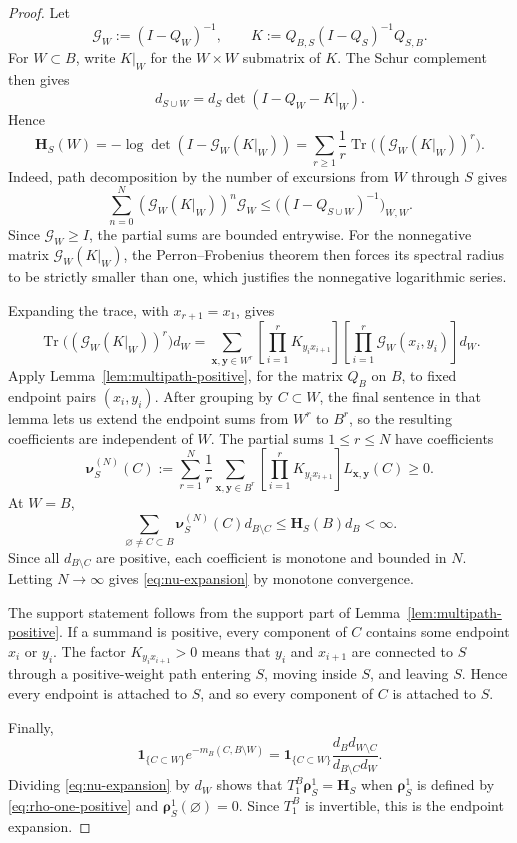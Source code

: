 \documentclass[11pt]{article}
\numberwithin{equation}{section}
\newcommand{\1}{\mathbf{1}}
\newcommand{\one}{\mathbf 1}
\newcommand{\Gc}{\mathcal G}
\newcommand{\bH}{\mathbf H}
\newcommand{\brho}{\boldsymbol{\rho}}
\newcommand{\bnu}{\boldsymbol{\nu}}
\begin{document}
\begin{proof}
Let
\[
        \Gc_W:=(I-Q_W)^{-1},
        \qquad
        K:=Q_{B,S}(I-Q_S)^{-1}Q_{S,B} .
\]
For \(W\subset B\), write \(K|_W\) for the \(W\times W\) submatrix of
\(K\).
The Schur complement then gives
\[
        d_{S\cup W}=d_S\det(I-Q_W-K|_W).
\]
Hence
\begin{equation}\label{eq:H-schur}
        \bH_S(W)=
        -\log\det(I-\Gc_W(K|_W))
        =\sum_{r\ge1}\frac1r\operatorname{Tr}\big((\Gc_W(K|_W))^r\big).
\end{equation}
Indeed, path decomposition by the number of excursions from \(W\) through
\(S\) gives
\[
 \sum_{n=0}^N(\Gc_W(K|_W))^n\Gc_W
 \leq\bigl((I-Q_{S\cup W})^{-1}\bigr)_{W,W}.
\]
Since \(\Gc_W\ge I\), the partial sums are bounded entrywise. For the
nonnegative matrix \(\Gc_W(K|_W)\), the Perron--Frobenius theorem then forces
its spectral radius to be strictly smaller than one, which justifies the
nonnegative logarithmic series.

Expanding the trace, with \(x_{r+1}=x_1\), gives
\[
        \operatorname{Tr}\big((\Gc_W(K|_W))^r\big)d_W
        =\sum_{\mathbf x,\mathbf y\in W^r}
        \left[\prod_{i=1}^rK_{y_i x_{i+1}}\right]
        \left[\prod_{i=1}^r\Gc_W(x_i,y_i)\right]d_W .
\]
Apply Lemma~\ref{lem:multipath-positive}, for the matrix \(Q_B\) on \(B\), to
fixed endpoint pairs \((x_i,y_i)\).  After grouping by \(C\subset W\), the
final sentence in that lemma lets us extend the endpoint sums
from \(W^r\) to \(B^r\), so the resulting coefficients are independent of \(W\).  The partial sums \(1\le r\le N\) have coefficients
\[
        \bnu_S^{(N)}(C):=
        \sum_{r=1}^N\frac1r\sum_{\mathbf x,\mathbf y\in B^r}
        \left[\prod_{i=1}^rK_{y_i x_{i+1}}\right]
        L_{\mathbf x,\mathbf y}(C)\ge0 .
\]
At \(W=B\),
\[
        \sum_{\varnothing\ne C\subset B}\bnu_S^{(N)}(C)d_{B\setminus C}
        \le \bH_S(B)d_B<\infty .
\]
Since all \(d_{B\setminus C}\) are positive, each coefficient is monotone and
bounded in \(N\).  Letting \(N\to\infty\) gives \eqref{eq:nu-expansion} by
monotone convergence.

The support statement follows from the support part of
Lemma~\ref{lem:multipath-positive}.  If a summand is positive, every component
of \(C\) contains some endpoint \(x_i\) or \(y_i\).  The factor
\(K_{y_i x_{i+1}}>0\) means that \(y_i\) and \(x_{i+1}\) are connected to
\(S\) through a positive-weight path entering \(S\), moving inside \(S\), and
leaving \(S\).  Hence every endpoint is attached to \(S\), and so every
component of \(C\) is attached to \(S\).

Finally,
\[
 \one_{\{C\subset W\}}e^{-m_B(C,B\setminus W)}
 =\one_{\{C\subset W\}}
  \frac{d_Bd_{W\setminus C}}{d_{B\setminus C}d_W}.
\]
Dividing \eqref{eq:nu-expansion} by \(d_W\) shows that \(T_1^B\brho_S^1=
\bH_S\) when \(\brho_S^1\) is defined by \eqref{eq:rho-one-positive} and
\(\brho_S^1(\varnothing)=0\).  Since \(T_1^B\) is invertible, this is the
endpoint expansion.
\end{proof}
\end{document}
